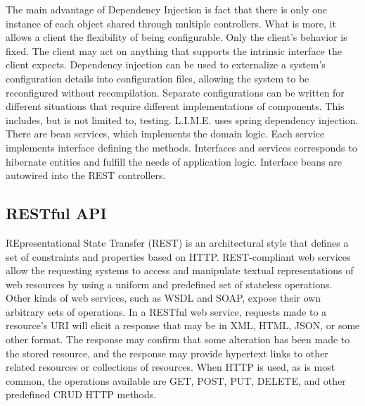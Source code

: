 \documentclass[a4paper,11pt,twoside]{report}
\theoremstyle{definition}
\begin{document}
The main advantage of Dependency Injection is fact that there is only one instance of each object shared through multiple controllers. What is more, it allows a client the flexibility of being configurable. Only the client's behavior is fixed. The client may act on anything that supports the intrinsic interface the client expects.
Dependency injection can be used to externalize a system's configuration details into configuration files, allowing the system to be reconfigured without recompilation. Separate configurations can be written for different situations that require different implementations of components. This includes, but is not limited to, testing.
	L.I.M.E. uses spring dependency injection. There are bean services, which implements the domain logic. Each service implements interface defining the methods. Interfaces and services corresponds to hibernate entities and fulfill the needs of application logic. Interface beans are autowired into the REST controllers.

\subsection{RESTful API}

REpresentational State Transfer (REST) is an architectural style that defines a set of constraints and properties based on HTTP. REST-compliant web services allow the requesting systems to access and manipulate textual representations of web resources by using a uniform and predefined set of stateless operations. Other kinds of web services, such as WSDL and SOAP, expose their own arbitrary sets of operations.
In a RESTful web service, requests made to a resource's URI will elicit a response that may be in XML, HTML, JSON, or some other format. The response may confirm that some alteration has been made to the stored resource, and the response may provide hypertext links to other related resources or collections of resources. When HTTP is used, as is most common, the operations available are GET, POST, PUT, DELETE, and other predefined CRUD HTTP methods. 
\end{document}
